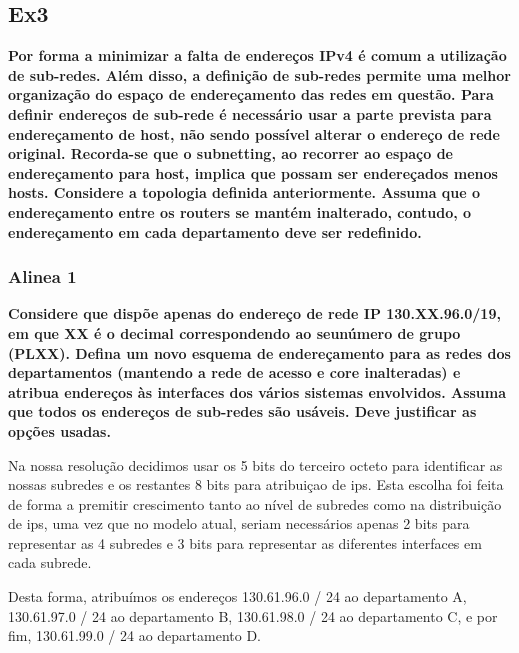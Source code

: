 \documentclass{article}
\begin{document}
\subsection{Ex3}
\textbf{Por forma a minimizar a falta de endereços IPv4 é comum a utilização de sub-redes. Além disso, a definição de sub-redes permite uma melhor organização do espaço de endereçamento das redes em questão. Para definir endereços de sub-rede é necessário usar a parte prevista para endereçamento de host, não sendo possível alterar o endereço de rede original. Recorda-se que o subnetting, ao recorrer ao espaço de endereçamento para  host, implica que possam ser endereçados menos hosts. Considere a topologia definida   anteriormente. Assuma que o endereçamento entre os routers se mantém inalterado, contudo, o endereçamento em cada departamento deve ser redefinido.}

\newpage

\subsubsection{Alinea 1}
\textbf{Considere que dispõe apenas do endereço de rede IP 130.XX.96.0/19, em que XX é o decimal correspondendo ao seunúmero de grupo (PLXX). Defina um novo esquema   de endereçamento para as redes dos departamentos (mantendo a rede de acesso e core inalteradas) e atribua endereços às interfaces dos vários sistemas envolvidos. Assuma que todos os endereços de sub-redes são usáveis. Deve justificar as opções usadas.}\\\par
Na nossa resolução decidimos usar os 5 bits do terceiro octeto para identificar as nossas subredes e os restantes 8 bits para atribuiçao de ips.
Esta escolha foi feita de forma a premitir crescimento tanto ao nível de subredes como na distribuição de ips, uma vez que no modelo atual, seriam necessários apenas 2 bits para representar as 4 subredes e 3 bits para representar as diferentes interfaces em cada subrede.\par Desta forma, atribuímos os endereços 130.61.96.0 / 24 ao departamento A, 130.61.97.0 / 24 ao departamento B, 130.61.98.0 / 24 ao departamento C, e por fim, 130.61.99.0 / 24 ao departamento D.
\end{document}
